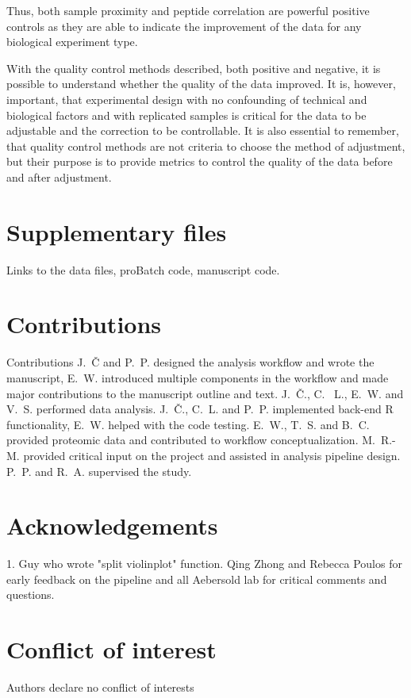 \documentclass[num-refs]{wiley-article}
\begin{document}
Thus, both sample proximity and peptide correlation are powerful positive controls as they are able to indicate the improvement of the data for any biological experiment type.

With the quality control methods described, both positive and negative, it is possible to understand whether the quality of the data improved. It is, however, important, that experimental design with no confounding of technical and biological factors and with replicated samples is critical for the data to be adjustable and the correction to be controllable. It is also essential to remember, that quality control methods are not criteria to choose the method of adjustment, but their purpose is to provide metrics to control the quality of the data before and after adjustment.







\section*{Supplementary files}
Links to the data files, proBatch code, manuscript code.

\section*{Contributions}

Contributions
J.~Č and P.~P. designed the analysis workflow and wrote the manuscript, E.~W. introduced multiple components in the workflow and made major contributions to the manuscript outline and text. J.~Č., C. ~L., E.~W. and V.~S. performed data analysis. J.~Č., C.~L. and P.~P. implemented back-end R functionality, E.~W. helped with the code testing. E.~W., T.~S. and B.~C. provided proteomic data and contributed to workflow conceptualization. M.~R.-M. provided critical input on the project and assisted in analysis pipeline design. P.~P. and R.~A. supervised the study.

\section*{Acknowledgements}
1. Guy who wrote "split violinplot" function. Qing Zhong and Rebecca Poulos for early feedback on the pipeline and all Aebersold lab for critical comments and questions.

\section*{Conflict of interest}
Authors declare no conflict of interests
\end{document}
